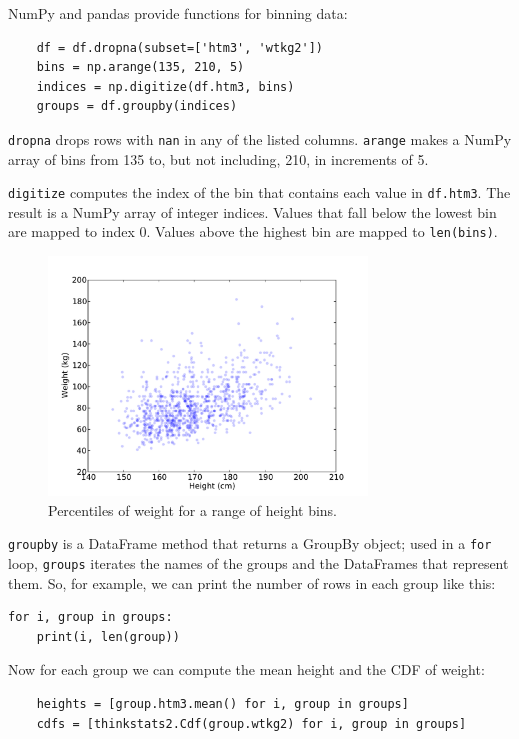 NumPy and pandas provide functions for binning data:

\begin{verbatim}
    df = df.dropna(subset=['htm3', 'wtkg2'])
    bins = np.arange(135, 210, 5)
    indices = np.digitize(df.htm3, bins)
    groups = df.groupby(indices)
\end{verbatim}

{\tt dropna} drops rows with {\tt nan} in any of the listed columns.
{\tt arange} makes a NumPy array of bins from 135 to, but not including,
210, in increments of 5.

{\tt digitize} computes the index of the bin that contains each value
in {\tt df.htm3}.  The result is a NumPy array of integer indices.
Values that fall below the lowest bin are mapped to index 0.  Values
above the highest bin are mapped to {\tt len(bins)}.

\begin{figure}
\centerline{\includegraphics[height=2.5in]{figs/scatter3.pdf}}
\caption{Percentiles of weight for a range of height bins.}
\label{scatter3}
\end{figure}

{\tt groupby} is a DataFrame method that returns a GroupBy object;
used in a {\tt for} loop, {\tt groups} iterates the names of the groups
and the DataFrames that represent them.  So, for example, we can
print the number of rows in each group like this:

\begin{verbatim}
for i, group in groups:
    print(i, len(group))
\end{verbatim}

Now for each group we can compute the mean height and the CDF
of weight:

\begin{verbatim}
    heights = [group.htm3.mean() for i, group in groups]
    cdfs = [thinkstats2.Cdf(group.wtkg2) for i, group in groups]
\end{verbatim}

